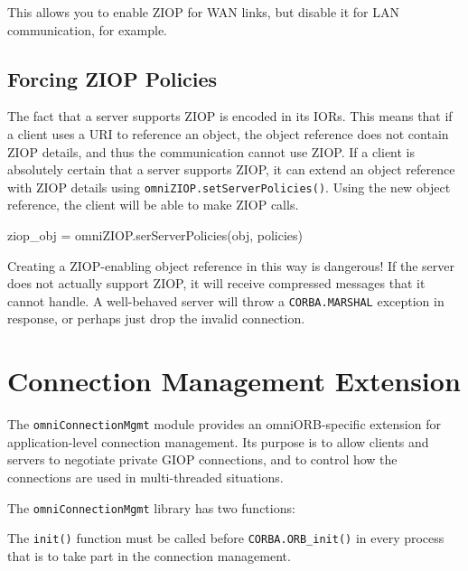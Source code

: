 \documentclass[11pt,oneside,a4paper]{book}
\newcommand{\code}[1]{\texttt{#1}}
\newcommand{\op}[1]{\texttt{#1()}}
\begin{document}
\noindent This allows you to enable ZIOP for WAN links, but disable it
for LAN communication, for example.


\subsection{Forcing ZIOP Policies}

The fact that a server supports ZIOP is encoded in its IORs. This
means that if a client uses a  URI to reference an
object, the object reference does not contain ZIOP details, and thus
the communication cannot use ZIOP. If a client is absolutely certain
that a server supports ZIOP, it can extend an object reference with
ZIOP details using \op{omniZIOP.setServerPolicies}. Using the new
object reference, the client will be able to make ZIOP calls.

\begin{pylisting}
ziop_obj = omniZIOP.serServerPolicies(obj, policies)
\end{pylisting}

Creating a ZIOP-enabling object reference in this way is dangerous!
If the server does not actually support ZIOP, it will receive
compressed messages that it cannot handle. A well-behaved server will
throw a \code{CORBA.MARSHAL} exception in response, or perhaps just
drop the invalid connection.



\section{Connection Management Extension}

The \code{omniConnectionMgmt} module provides an omniORB-specific
extension for application-level connection management. Its purpose is
to allow clients and servers to negotiate private GIOP connections,
and to control how the connections are used in multi-threaded
situations.

The \code{omniConnectionMgmt} library has two functions:

\begin{pylisting}
  init()
  makeRestrictedReference(object_ref,
			  connection_id,
			  max_connections,
			  max_threads,
			  data_batch,
			  permit_interleaved,
			  server_hold_open);
};
\end{pylisting}


The \op{init} function must be called before \op{CORBA.ORB\_init} in
every process that is to take part in the connection management.
\end{document}
